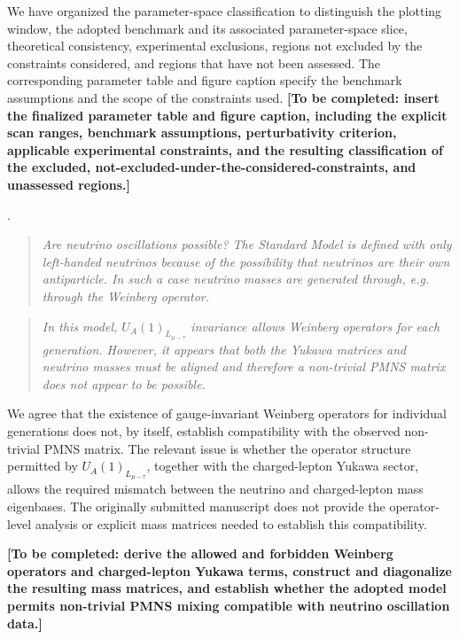 \documentclass[12pt,a4paper]{article}
\begin{document}
We have organized the parameter-space classification to distinguish the plotting window, the adopted benchmark and its associated parameter-space slice, theoretical consistency, experimental exclusions, regions not excluded by the constraints considered, and regions that have not been assessed. The corresponding parameter table and figure caption specify the benchmark assumptions and the scope of the constraints used. \textbf{[To be completed: insert the finalized parameter table and figure caption, including the explicit scan ranges, benchmark assumptions, perturbativity criterion, applicable experimental constraints, and the resulting classification of the excluded, not-excluded-under-the-considered-constraints, and unassessed regions.]}

\medskip
{}.

\begin{quote}\itshape
Are neutrino oscillations possible? The Standard Model is defined with only left-handed neutrinos because of the possibility that neutrinos are their own antiparticle. In such a case neutrino masses are generated through, e.g. through the Weinberg operator.
\end{quote}

\medskip
{}

\begin{quote}\itshape
In this model, \(U_A(1)_{L_{\mu-\tau}}\) invariance allows Weinberg operators for each generation. However, it appears that both the Yukawa matrices and neutrino masses must be aligned and therefore a non-trivial PMNS matrix does not appear to be possible.
\end{quote}


We agree that the existence of gauge-invariant Weinberg operators for individual generations does not, by itself, establish compatibility with the observed non-trivial PMNS matrix. The relevant issue is whether the operator structure permitted by \(U_A(1)_{L_{\mu-\tau}}\), together with the charged-lepton Yukawa sector, allows the required mismatch between the neutrino and charged-lepton mass eigenbases. The originally submitted manuscript does not provide the operator-level analysis or explicit mass matrices needed to establish this compatibility.

\textbf{[To be completed: derive the allowed and forbidden Weinberg operators and charged-lepton Yukawa terms, construct and diagonalize the resulting mass matrices, and establish whether the adopted model permits non-trivial PMNS mixing compatible with neutrino oscillation data.]}
\end{document}
